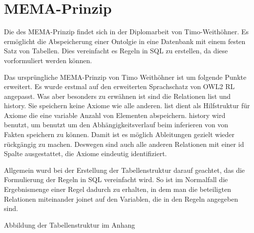 \section{MEMA-Prinzip}
Die des MEMA-Prinzip findet sich in der Diplomarbeit von Timo-Weithöhner. Es ermöglicht die Abspeicherung einer Ontolgie in eine Datenbank mit einem festen Satz von Tabellen. Dies vereinfacht es Regeln in SQL zu erstellen, da diese vorformuliert werden können.

Das ursprüngliche MEMA-Prinzip von Timo Weithöhner ist um folgende Punkte erweitert.
Es wurde erstmal auf den erweiterten Sprachschatz von OWL2 RL angepasst. Was aber besonders zu erwähnen ist sind die Relationen list und history. Sie speichern keine Axiome wie alle anderen. list dient als Hilfstruktur für Axiome die eine variable Anzahl von Elementen abspeichern. history wird benutzt, um benutzt um den Abhängigkeitsverlauf beim inferieren von von Fakten speichern zu können. Damit ist es möglich Ableitungen gezielt wieder rückgängig zu machen. Deswegen sind auch alle anderen Relationen mit einer id Spalte ausgestattet, die Axiome eindeutig identifiziert.

Allgemein wurd bei der Erstellung der Tabellenstruktur darauf geachtet, das die Formulierung der Regeln in SQL vereinfacht wird. So ist im Normalfall die Ergebnismenge einer Regel dadurch zu erhalten, in dem man die beteiligten Relationen miteinander joinet auf den Variablen, die in den Regeln angegeben sind.

Abbildung der Tabellenstruktur im Anhang